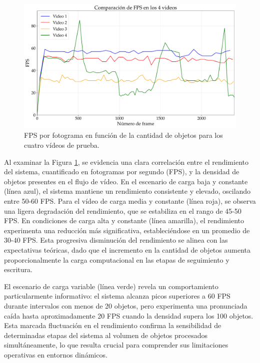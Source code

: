 \documentclass[11pt,spanish,listoffigures,listoftables]{tfgetsinf}
\begin{document}
\begin{figure}[H]
   \centering
   \includegraphics[width=\linewidth]{excels/inferencia/cantidad_objetos/resultados/max_fps_4_videos/fps_comparison.pdf}
   \caption[FPS por fotograma en función de la cantidad de objetos para los cuatro vídeos de prueba]{FPS por fotograma en función de la cantidad de objetos para los cuatro vídeos de prueba.}
   \label{fig:fps_por_frame}
\end{figure}

Al examinar la Figura \ref{fig:fps_por_frame}, se evidencia una clara correlación entre el rendimiento del sistema, cuantificado en fotogramas por segundo (FPS), y la densidad de objetos presentes en el flujo de vídeo. En el escenario de carga baja y constante (línea azul), el sistema mantiene un rendimiento consistente y elevado, oscilando entre 50-60 FPS. Para el vídeo de carga media y constante (línea roja), se observa una ligera degradación del rendimiento, que se estabiliza en el rango de 45-50 FPS. En condiciones de carga alta y constante (línea amarilla), el rendimiento experimenta una reducción más significativa, estableciéndose en un promedio de 30-40 FPS. Esta progresiva disminución del rendimiento se alinea con las expectativas teóricas, dado que el incremento en la cantidad de objetos aumenta proporcionalmente la carga computacional en las etapas de seguimiento y escritura.

El escenario de carga variable (línea verde) revela un comportamiento particularmente informativo: el sistema alcanza picos superiores a 60 FPS durante intervalos con menos de 20 objetos, pero experimenta una pronunciada caída hasta aproximadamente 20 FPS cuando la densidad supera los 100 objetos. Esta marcada fluctuación en el rendimiento confirma la sensibilidad de determinadas etapas del sistema al volumen de objetos procesados simultáneamente, lo que resulta crucial para comprender sus limitaciones operativas en entornos dinámicos.
\end{document}

